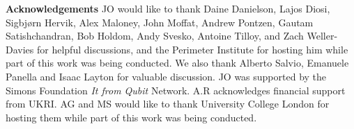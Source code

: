 \documentclass[aps,preprintnumbers,superscriptaddress,longbibliography]{revtex4-1}
\begin{document}



{\bf Acknowledgements}
JO would like to thank Daine Danielson, Lajos Diosi, Sigbjørn Hervik, Alex Maloney, John Moffat, Andrew Pontzen, Gautam Satishchandran, Bob Holdom, Andy Svesko, Antoine Tilloy, and Zach Weller-Davies for helpful discussions, and the Perimeter Institute for hosting him while part of this work was being conducted. %
We also thank Alberto Salvio, Emanuele Panella and Isaac Layton for valuable discussion.
 JO was supported by the Simons Foundation {\it It from Qubit} Network. A.R acknowledges financial support from UKRI.
AG and MS would like to thank University College London for hosting them while part of this work was being conducted.
\end{document}
